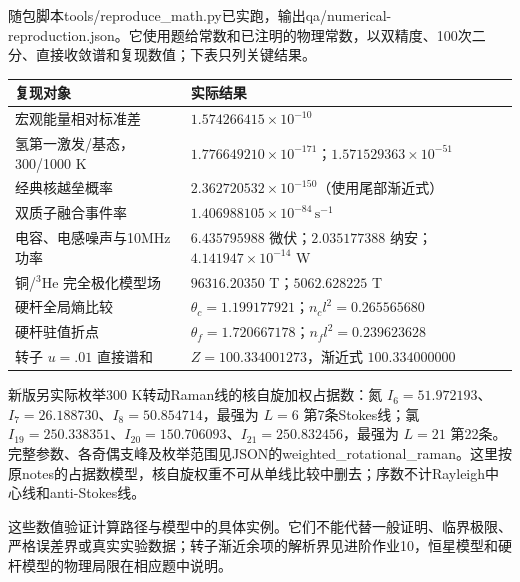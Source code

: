 随包脚本tools/reproduce\_math.py已实跑，输出qa/numerical-reproduction.json。它使用题给常数和已注明的物理常数，以双精度、100次二分、直接收敛谱和复现数值；下表只列关键结果。
\begin{longtable}{p{}p{}}
\toprule 复现对象 & 实际结果\\\midrule\endhead
宏观能量相对标准差 & $1.574266415\times10^{-10}$\\
氢第一激发/基态，300/1000 K & $1.776649210\times10^{-171}$；$1.571529363\times10^{-51}$\\
经典核越垒概率 & $2.362720532\times10^{-150}$（使用尾部渐近式）\\
双质子融合事件率 & $1.406988105\times10^{-84}\,\mathrm{s}^{-1}$\\
电容、电感噪声与10MHz功率 & $6.435795988$ 微伏；$2.035177388$ 纳安；$4.141947\times10^{-14}$ W\\
铜/$^3$He 完全极化模型场 & $96316.20350$ T；$5062.628225$ T\\
硬杆全局熵比较 & $\theta_c=1.199177921$；$n_cl^2=0.265565680$\\
硬杆驻值折点 & $\theta_f=1.720667178$；$n_fl^2=0.239623628$\\
转子 $u=.01$ 直接谱和 & $Z=100.334001273$，渐近式 $100.334000000$\\\bottomrule
\end{longtable}
新版另实际枚举300 K转动Raman线的核自旋加权占据数：氮 $I_6=51.972193$、$I_7=26.188730$、$I_8=50.854714$，最强为 $L=6$ 第7条Stokes线；氯 $I_{19}=250.338351$、$I_{20}=150.706093$、$I_{21}=250.832456$，最强为 $L=21$ 第22条。完整参数、各奇偶支峰及枚举范围见JSON的weighted\_rotational\_raman。这里按原notes的占据数模型，核自旋权重不可从单线比较中删去；序数不计Rayleigh中心线和anti-Stokes线。

这些数值验证计算路径与模型中的具体实例。它们不能代替一般证明、临界极限、严格误差界或真实实验数据；转子渐近余项的解析界见进阶作业10，恒星模型和硬杆模型的物理局限在相应题中说明。
